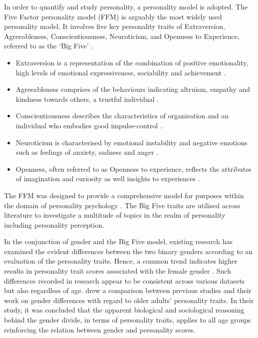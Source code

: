 \documentclass{l4proj}
\begin{document}
In order to quantify and study personality, a personality model is adopted.
The Five Factor personality model (FFM) is arguably the most widely used personality model. It involves five key personality traits of Extraversion, Agreeableness, Conscientiousness, Neuroticism, and Openness to Experience, referred to as the ‘Big Five’ \citep{Mccrae1992}. 
\begin{itemize}
    \item Extraversion is a representation of the combination of positive emotionality, high levels of emotional expressiveness, sociability and achievement \citep{depue1999neurobiology,power2015heritability}.
    
    \item Agreeableness comprises of the behaviours indicating altruism, empathy and kindness towards others, a trustful individual \citep{power2015heritability,john1999big}.
    
    \item Conscientiousness describes the characteristics of organisation and an individual who embodies good impulse-control \citep{costa2001gender,power2015heritability}.
    
    \item Neuroticism is characterised by emotional instability and negative emotions such as feelings of anxiety, sadness and anger \citep{costa2001gender,power2015heritability}.
    
    \item Openness, often referred to as Openness to experience, reflects the attributes of imagination and curiosity as well insights to experiences \citep{costa2001gender}.
\end{itemize}


The FFM was designed to provide a comprehensive model for purposes within the domain of personality psychology \citep{Mccrae1992}. The Big Five traits are utilised across literature to investigate a multitude of topics in the realm of personality including personality perception.

In the conjunction of gender and the Big Five model, existing research has examined the evident differences between the two binary genders according to an evaluation of the personality traits. Hence, a common trend indicates higher results in personality trait scores associated with the female gender \citep{Schmitt2008, Weisberg2011,Chapman2007}.
Such differences recorded in research appear to be consistent across various datasets but also regardless of age. \citet{Chapman2007} drew a comparison between previous studies and their work on gender differences with regard to older adults’ personality traits. In their study, it was concluded that the apparent biological and sociological reasoning behind the gender divide, in terms of personality traits, applies to all age groups reinforcing the relation between gender and personality scores.
\end{document}
